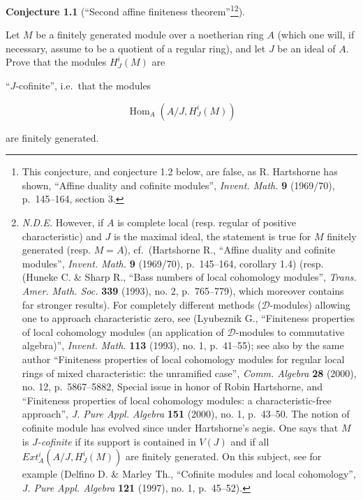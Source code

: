 \documentclass[
]{article}
\begin{document}
\textbf{Conjecture 1.1} (``Second affine finiteness
theorem''\footnote{This conjecture, and conjecture 1.2 below, are false,
  as R. Hartshorne has shown, ``Affine duality and cofinite modules'',
  \emph{Invent. Math.} \textbf{9} (1969/70), p.~145--164, section 3.}\footnote{\emph{N.D.E.}
  However, if \(A\) is complete local (resp. regular of positive
  characteristic) and \(J\) is the maximal ideal, the statement is true
  for \(M\) finitely generated (resp. \(M = A\)), cf.~(Hartshorne R.,
  ``Affine duality and cofinite modules'', \emph{Invent. Math.}
  \textbf{9} (1969/70), p.~145--164, corollary 1.4) (resp. (Huneke C. \&
  Sharp R., ``Bass numbers of local cohomology modules'', \emph{Trans.
  Amer. Math. Soc.} \textbf{339} (1993), no. 2, p.~765--779), which
  moreover contains far stronger results). For completely different
  methods (\(\mathcal{D}\)-modules) allowing one to approach
  characteristic zero, see (Lyubeznik G., ``Finiteness properties of
  local cohomology modules (an application of \(\mathcal{D}\)-modules to
  commutative algebra)'', \emph{Invent. Math.} \textbf{113} (1993), no.
  1, p.~41--55); see also by the same author ``Finiteness properties of
  local cohomology modules for regular local rings of mixed
  characteristic: the unramified case'', \emph{Comm. Algebra}
  \textbf{28} (2000), no. 12, p.~5867--5882, Special issue in honor of
  Robin Hartshorne, and ``Finiteness properties of local cohomology
  modules: a characteristic-free approach'', \emph{J. Pure Appl.
  Algebra} \textbf{151} (2000), no. 1, p.~43--50. The notion of cofinite
  module has evolved since under Hartshorne's aegis. One says that \(M\)
  is \emph{\(J\)-cofinite} if its support is contained in \(V(J)\) and
  if all \(Ext^{i}_{A}(A/J, H^{i}_{J}(M))\) are finitely generated. On
  this subject, see for example (Delfino D. \& Marley Th., ``Cofinite
  modules and local cohomology'', \emph{J. Pure Appl. Algebra}
  \textbf{121} (1997), no. 1, p.~45--52).}).

Let \(M\) be a finitely generated module over a noetherian ring \(A\)
(which one will, if necessary, assume to be a quotient of a regular
ring), and let \(J\) be an ideal of \(A\). Prove that the modules
\(H^{i}_{J}(M)\) are

``\(J\)-cofinite'', i.e.~that the modules

\[
\operatorname{Hom}_{A}(A/J, H^{i}_{J}(M))
\]

are finitely generated.
\end{document}
